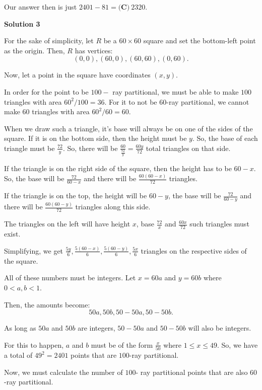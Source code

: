 \begin{enumerate}
 
Our answer then is just $2401-81=\boxed{\textbf{(C)}\ 2320}$.

 



\textbf{Solution 3}

For the sake of simplicity, let $R$ be a $60 \times 60$ square and set the bottom-left point as the origin. Then, $R$ has vertices: 
 \[(0,0), (60,0), (60,60), (0,60).\]

 Now, let a point in the square have coordinates $(x, y).$

 In order for the point to be $100-$ ray partitional, we must be able to make $100$ triangles with area $60^2/100 = 36.$ For it to not be $60$-ray partitional, we cannot make $60$ triangles with area $60^2/60 = 60.$

 When we draw such a triangle, it's base will always be on one of the sides of the square. If it is on the bottom side, then the height must be $y$. So, the base of each triangle must be $\frac{72}{y}.$ So, there will be $\frac{60}{\frac{72}{y}} = \frac{60y}{72}$ total triangles on that side.

 If the triangle is on the right side of the square, then the height has to be $60 - x.$ So, the base will be $\frac{72}{60-x}$ and there will be $\frac{60 (60-x)}{72}$ triangles.

 If the triangle is on the top, the height will be $60-y$, the base will be $\frac{72}{60-y}$ and there will be $\frac{60 (60-y)}{72}$ triangles along this side.

 The triangles on the left will have height $x$, base $\frac{72}{x}$ and $\frac{60x}{72}$ such triangles must exist. 

 Simplifying, we get $\frac{5y}{6}, \frac{5 (60-x)}{6}, \frac{5(60-y)}{6}, \frac{5x}{6}$ triangles on the respective sides of the square. 

 All of these numbers must be integers. Let $x = 60a$ and $y = 60b$ where $0 < a, b < 1.$

 
Then, the amounts become: 
 \[50a, 50b,  50 - 50a, 50 - 50b.\]

 As long as $50a$ and $50b$ are integers, $50 - 50a$ and $50 - 50b$ will also be integers. 

 For this to happen, $a$ and $b$ must be of the form $\frac{x}{50}$ where $1 \le x \le 49.$ So, we have a total of $49^2 = 2401$ points that are $100$-ray partitional. 

 Now, we must calculate the number of $100$- ray partitional points that are also $60$-ray partitional. 


\end{enumerate}
